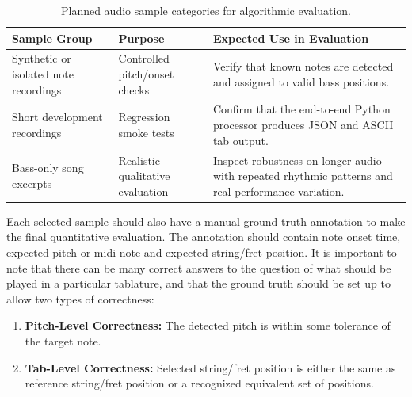 \documentclass[a4paper, 12pt, titlepage]{article}
\begin{document}
\begin{table}[H]
    \centering
    \begin{tabular}{|p{}|p{}|p{}|}
        \hline
        \textbf{Sample Group} & \textbf{Purpose} & \textbf{Expected Use in Evaluation} \\
        \hline
        Synthetic or isolated note recordings & Controlled pitch/onset checks & Verify that known notes are detected and assigned to valid bass positions. \\
        \hline
        Short development recordings & Regression smoke tests & Confirm that the end-to-end Python processor produces JSON and ASCII tab output. \\
        \hline
        Bass-only song excerpts & Realistic qualitative evaluation & Inspect robustness on longer audio with repeated rhythmic patterns and real performance variation. \\
        \hline
    \end{tabular}
    \caption{Planned audio sample categories for algorithmic evaluation.}
    \label{tab:tabee_dataset_categories}
\end{table}

Each selected sample should also have a manual ground-truth annotation to make the final quantitative evaluation. The annotation should contain note onset time, expected pitch or midi note and expected string/fret position. It is important to note that there can be many correct answers to the question of what should be played in a particular tablature, and that the ground truth should be set up to allow two types of correctness:

\begin{enumerate}
    \item \textbf{Pitch-Level Correctness:} The detected pitch is within some tolerance of the target note.
    \item \textbf{Tab-Level Correctness:} Selected string/fret position is either the same as reference string/fret position or a recognized equivalent set of positions.
\end{enumerate}
\end{document}

